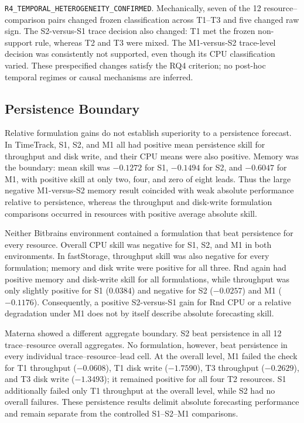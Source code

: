 \documentclass[a4paper,fleqn]{cas-dc}
\begin{document}
\noindent\texttt{R4\_TEMPORAL\_HETEROGENEITY\_CONFIRMED}. Mechanically, seven of the 12
resource--comparison pairs changed frozen classification across T1--T3 and
five changed raw sign. The S2-versus-S1 trace decision also changed: T1 met the
frozen non-support rule, whereas T2 and T3 were mixed. The M1-versus-S2
trace-level decision was consistently not supported, even though its CPU
classification varied. These prespecified changes satisfy the RQ4 criterion;
no post-hoc temporal regimes or causal mechanisms are inferred.

\subsection{Persistence Boundary}
\label{sec:results-persistence}

Relative formulation gains do not establish superiority to a persistence
forecast. In TimeTrack, S1, S2, and M1 all had positive mean persistence skill
for throughput and disk write, and their CPU means were also positive. Memory
was the boundary: mean skill was $-0.1272$ for S1, $-0.1494$ for S2, and
$-0.6047$ for M1, with positive skill at only two, four, and zero of eight
leads. Thus the large negative M1-versus-S2 memory result coincided with weak
absolute performance relative to persistence, whereas the throughput and
disk-write formulation comparisons occurred in resources with positive
average absolute skill.

Neither Bitbrains environment contained a formulation that beat persistence
for every resource. Overall CPU skill was negative for S1, S2, and M1 in both
environments. In fastStorage, throughput skill was also negative for every
formulation; memory and disk write were positive for all three. Rnd again had
positive memory and disk-write skill for all formulations, while throughput
was only slightly positive for S1 ($0.0384$) and negative for S2 ($-0.0257$)
and M1 ($-0.1176$). Consequently, a positive S2-versus-S1 gain for Rnd CPU or a
relative degradation under M1 does not by itself describe absolute forecasting
skill.

Materna showed a different aggregate boundary. S2 beat persistence in all 12
trace--resource overall aggregates. No formulation, however, beat persistence
in every individual trace--resource--lead cell. At the overall level, M1 failed
the check for T1 throughput ($-0.0608$), T1 disk write ($-1.7590$), T3
throughput ($-0.2629$), and T3 disk write ($-1.3493$); it remained positive for
all four T2 resources. S1 additionally failed only T1 throughput at the overall
level, while S2 had no overall failures. These persistence results delimit
absolute forecasting performance and remain separate from the controlled
S1--S2--M1 comparisons.
\end{document}
